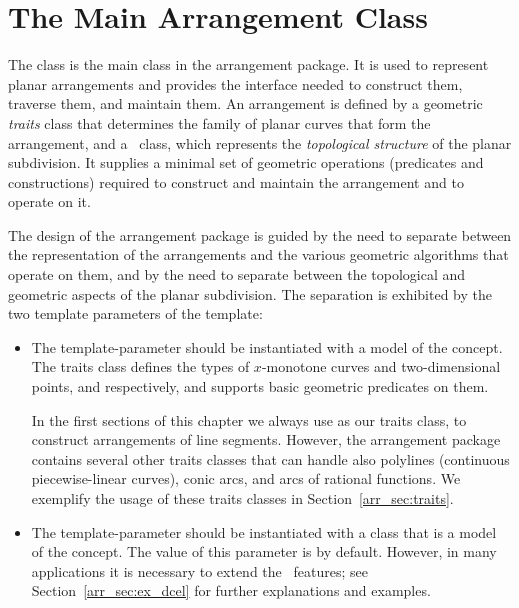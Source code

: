 \section{The Main Arrangement Class}
\label{arr_sec:arr_class}

The class  is the main class in
the arrangement package. It is used to represent planar
arrangements and provides the interface needed to construct them,
traverse them, and maintain them. An arrangement is defined by
a geometric {\em traits} class that determines the family of planar
curves that form the arrangement, and a \dcel\ class, which
represents the {\em topological structure} of the planar subdivision.
It supplies a minimal set of geometric operations (predicates and
constructions) required to construct and maintain the arrangement
and to operate on it.

The design of the arrangement package is guided by the need to
separate between the representation of the arrangements and the
various geometric algorithms that operate on them, and by the need to
separate between the topological and geometric aspects of the planar
subdivision. The separation is exhibited by the two template
parameters of the  template:
\begin{itemize}
\item The  template-parameter should be instantiated with
a model of the  concept. The traits
class defines the types of $x$-monotone curves and two-dimensional
points,  and  respectively, and
supports basic geometric predicates on them.

In the first sections of this chapter we always use
 as our traits class, to construct
arrangements of line segments. However, the arrangement package 
contains several other traits classes that can handle also
polylines (continuous piecewise-linear curves), conic arcs, and arcs
of rational functions. We exemplify the usage of these traits classes
in Section~\ref{arr_sec:traits}.
\item The  template-parameter should be instantiated with
a class that is a model of the  concept. The
value of this parameter is  by default.
However, in many applications it is necessary
to extend the \dcel\ features; see Section~\ref{arr_sec:ex_dcel} for
further explanations and examples.
\end{itemize}

